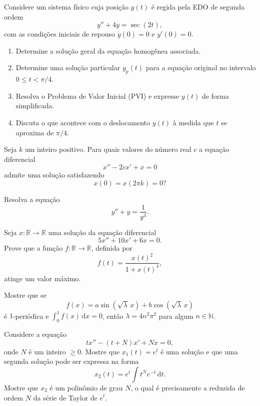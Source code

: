 \documentclass[10pt,a4paper]{amsart}
\newcommand{\R}{\mathbb{R}}
\renewcommand{\d}{\mathrm{d}}
\begin{document}
 Considere um sistema físico cuja posição $y(t)$ é regida pela EDO de segunda ordem
\[
    y'' + 4y = \sec(2t),
\]
com as condições iniciais de repouso $y(0) = 0$ e $y'(0) = 0$.
\begin{enumerate}[label=(\alph*)]
    \item Determine a solução geral da equação homogênea associada.
    \item Determine uma solução particular $y_p(t)$ para a equação original no intervalo $0 \leq t < \pi/4$.
    \item Resolva o Problema de Valor Inicial (PVI) e expresse $y(t)$ de forma simplificada.
    \item Discuta o que acontece com o deslocamento $y(t)$ à medida que $t$ se aproxima de $\pi/4$.
\end{enumerate}

\vspace{5mm}

 Seja $k$ um inteiro positivo. Para quais valores do número real $c$ a equação diferencial
\[
    x'' - 2cx' + x = 0
\]
admite uma solução satisfazendo
\[
    x(0) = x(2\pi k) = 0?
\]

\vspace{5mm}

 Resolva a equação
\[
    y'' + y = \frac{1}{y^3}.
\]

\vspace{5mm}

 Seja $x : \R \to \R$ uma solução da equação diferencial
\[
    5x'' + 10x' + 6x = 0.
\]
Prove que a função $f : \R \to \R$, definida por
\[
    f(t) = \frac{x(t)^2}{1 + x(t)^4},
\]
atinge um valor máximo.

\vspace{5mm}

 Mostre que se
\[
    f(x) = a \sin(\sqrt{\lambda}\, x) + b \cos(\sqrt{\lambda}\, x)
\]
é $1$-periódica e $\int_0^1 f(x) \,\d x = 0$, então $\lambda = 4 n^2 \pi^2$ para algum $n \in \mathbb{N}$.

\vspace{5mm}

 Considere a equação
\[
    t x'' - (t + N)x' + Nx = 0,
\]
onde $N$ é um inteiro $\geq 0$. Mostre que $x_1(t) = e^t$ é uma solução e que uma segunda solução pode ser expressa na forma
\[
    x_2(t) = e^t \int t^N e^{-t} \,\d t.
\]
Mostre que $x_2$ é um polinômio de grau $N$, o qual é precisamente a reduzida de ordem $N$ da série de Taylor de $e^t$.
\end{document}
